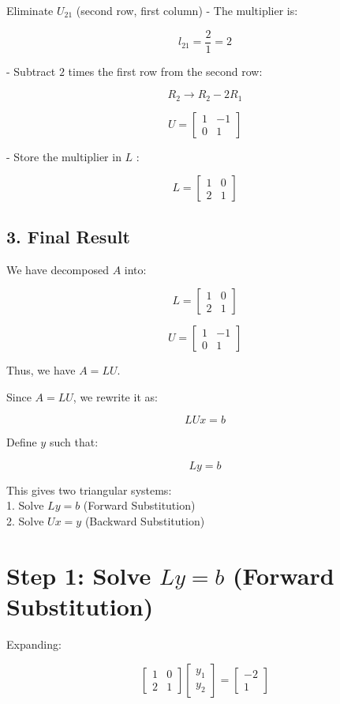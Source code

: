 \documentclass[journal]{IEEEtran}
\begin{document}
Eliminate $ U_{21} $ (second row, first column)
- The multiplier is:

\[
l_{21} = \frac{2}{1} = 2
\]

- Subtract $2$ times the first row from the second row:

\[
R_2 \rightarrow R_2 - 2R_1
\]

\[
U =
\begin{bmatrix}
1 & -1 \\
0 & 1
\end{bmatrix}
\]

- Store the multiplier in  $L$ :

\[
L =
\begin{bmatrix}
1 & 0 \\
2 & 1
\end{bmatrix}
\]

\subsection*{3. Final Result}
We have decomposed $ A $ into:

\[
L =
\begin{bmatrix}
1 & 0 \\
2 & 1
\end{bmatrix}
\]

\[
U =
\begin{bmatrix}
1 & -1 \\
0 & 1
\end{bmatrix}
\]

Thus, we have \( A = LU \).

Since \( A = LU \), we rewrite it as:

\[
LUx = b
\]

Define \( y \) such that:

\[
Ly = b
\]

This gives two triangular systems:\\
1. Solve \( Ly = b \) (Forward Substitution)\\
2. Solve \( Ux = y \) (Backward Substitution)

\section*{Step 1: Solve $ Ly = b $ (Forward Substitution)}

Expanding:

\[
\begin{bmatrix}
1 & 0 \\
2 & 1
\end{bmatrix}
\begin{bmatrix}
y_1 \\
y_2
\end{bmatrix}
=
\begin{bmatrix}
-2 \\
1
\end{bmatrix}
\]
\end{document}
